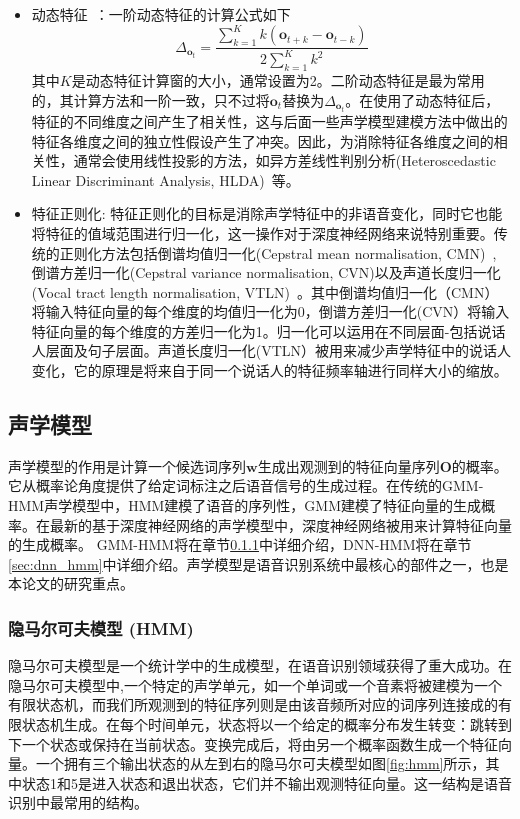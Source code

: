 \begin{itemize}
    \item 动态特征~\cite{furui1986speaker}：一阶动态特征的计算公式如下
    \begin{equation}
        \Delta_{\mathbf{o}_t}=\frac{\sum_{k=1}^K k(\mathbf{o}_{t+k}-\mathbf{o}_{t-k})}{2\sum_{k=1}^K{k^2}}
    \end{equation}
    其中$K$是动态特征计算窗的大小，通常设置为2。二阶动态特征是最为常用的，其计算方法和一阶一致，只不过将$\mathbf{o}_t$替换为$\Delta_{\mathbf{o}_t}$。在使用了动态特征后，特征的不同维度之间产生了相关性，这与后面一些声学模型建模方法中做出的特征各维度之间的独立性假设产生了冲突。因此，为消除特征各维度之间的相关性，通常会使用线性投影的方法，如异方差线性判别分析(Heteroscedastic Linear Discriminant Analysis, HLDA)~\cite{kumar1998heteroscedastic}等。
    \item 特征正则化: 特征正则化的目标是消除声学特征中的非语音变化，同时它也能将特征的值域范围进行归一化，这一操作对于深度神经网络来说特别重要。传统的正则化方法包括倒谱均值归一化(Cepstral mean normalisation, CMN)~\cite{atal1974effectiveness}, 倒谱方差归一化(Cepstral variance normalisation, CVN)\cite{woodland1995development}以及声道长度归一化(Vocal tract length normalisation, VTLN)~\cite{lee1996speaker}。其中倒谱均值归一化（CMN）将输入特征向量的每个维度的均值归一化为0，倒谱方差归一化(CVN）将输入特征向量的每个维度的方差归一化为1。归一化可以运用在不同层面-包括说话人层面及句子层面。声道长度归一化(VTLN）被用来减少声学特征中的说话人变化，它的原理是将来自于同一个说话人的特征频率轴进行同样大小的缩放。
\end{itemize}

\subsection{声学模型}
声学模型的作用是计算一个候选词序列$\mathbf{w}$生成出观测到的特征向量序列$\mathbf{O}$的概率。它从概率论角度提供了给定词标注之后语音信号的生成过程。在传统的GMM-HMM声学模型中，HMM建模了语音的序列性，GMM建模了特征向量的生成概率。在最新的基于深度神经网络的声学模型中，深度神经网络被用来计算特征向量的生成概率。 GMM-HMM将在章节\ref{sec:hmm}中详细介绍，DNN-HMM将在章节\ref{sec:dnn_hmm}中详细介绍。声学模型是语音识别系统中最核心的部件之一，也是本论文的研究重点。

\subsubsection{隐马尔可夫模型 (HMM)}
\label{sec:hmm}
隐马尔可夫模型是一个统计学中的生成模型，在语音识别领域获得了重大成功。在隐马尔可夫模型中,一个特定的声学单元，如一个单词或一个音素将被建模为一个有限状态机，而我们所观测到的特征序列则是由该音频所对应的词序列连接成的有限状态机生成。在每个时间单元，状态将以一个给定的概率分布发生转变：跳转到下一个状态或保持在当前状态。变换完成后，将由另一个概率函数生成一个特征向量。一个拥有三个输出状态的从左到右的隐马尔可夫模型如图\ref{fig:hmm}所示，其中状态1和5是进入状态和退出状态，它们并不输出观测特征向量。这一结构是语音识别中最常用的结构。

